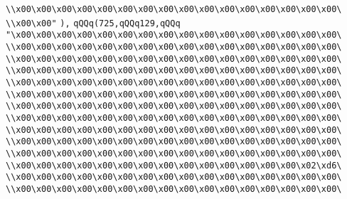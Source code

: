 \verb|\\x00\x00\x00\x00\x00\x00\x00\x00\x00\x00\x00\x00\x00\x00\x00\x00\|\newline
\verb|\\x00\x00"|\newline
\verb|),|\newline
\verb|qQQq(725,qQQq129,qQQq|\newline
\verb|"\x00\x00\x00\x00\x00\x00\x00\x00\x00\x00\x00\x00\x00\x00\x00\x00\|\newline
\verb|\\x00\x00\x00\x00\x00\x00\x00\x00\x00\x00\x00\x00\x00\x00\x00\x00\|\newline
\verb|\\x00\x00\x00\x00\x00\x00\x00\x00\x00\x00\x00\x00\x00\x00\x00\x00\|\newline
\verb|\\x00\x00\x00\x00\x00\x00\x00\x00\x00\x00\x00\x00\x00\x00\x00\x00\|\newline
\verb|\\x00\x00\x00\x00\x00\x00\x00\x00\x00\x00\x00\x00\x00\x00\x00\x00\|\newline
\verb|\\x00\x00\x00\x00\x00\x00\x00\x00\x00\x00\x00\x00\x00\x00\x00\x00\|\newline
\verb|\\x00\x00\x00\x00\x00\x00\x00\x00\x00\x00\x00\x00\x00\x00\x00\x00\|\newline
\verb|\\x00\x00\x00\x00\x00\x00\x00\x00\x00\x00\x00\x00\x00\x00\x00\x00\|\newline
\verb|\\x00\x00\x00\x00\x00\x00\x00\x00\x00\x00\x00\x00\x00\x00\x00\x00\|\newline
\verb|\\x00\x00\x00\x00\x00\x00\x00\x00\x00\x00\x00\x00\x00\x00\x00\x00\|\newline
\verb|\\x00\x00\x00\x00\x00\x00\x00\x00\x00\x00\x00\x00\x00\x00\x00\x00\|\newline
\verb|\\x00\x00\x00\x00\x00\x00\x00\x00\x00\x00\x00\x00\x00\x00\x02\xd6\|\newline
\verb|\\x00\x00\x00\x00\x00\x00\x00\x00\x00\x00\x00\x00\x00\x00\x00\x00\|\newline
\verb|\\x00\x00\x00\x00\x00\x00\x00\x00\x00\x00\x00\x00\x00\x00\x00\x00\|\newline
